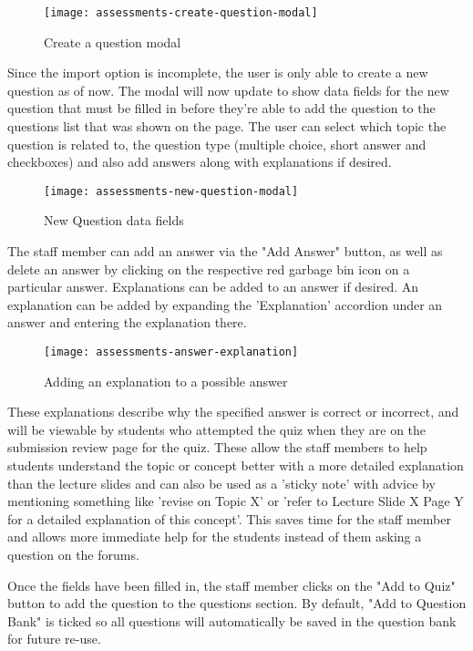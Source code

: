 \begin{figure}[!hbpt]
	\centering
	\texttt{[image: assessments-create-question-modal]}
	\caption{Create a question modal}
\end{figure}

Since the import option is incomplete, the user is only able to create a new question as of now. The modal will now update to show data fields for the new question that must be filled in before they're able to add the question to the questions list that was shown on the page. The user can select which topic the question is related to, the question type (multiple choice, short answer and checkboxes) and also add answers along with explanations if desired.

\begin{figure}[!hbpt]
	\centering
	\texttt{[image: assessments-new-question-modal]}
	\caption{New Question data fields}
\end{figure}

The staff member can add an answer via the "Add Answer" button, as well as delete an answer by clicking on the respective red garbage bin icon on a particular answer. Explanations can be added to an answer if desired. An explanation can be added by expanding the 'Explanation' accordion under an answer and entering the explanation there.

\begin{figure}[!hbpt]
	\centering
	\texttt{[image: assessments-answer-explanation]}
	\caption{Adding an explanation to a possible answer}
\end{figure}

These explanations describe why the specified answer is correct or incorrect, and will be viewable by students who attempted the quiz when they are on the submission review page for the quiz. These allow the staff members to help students understand the topic or concept better with a more detailed explanation than the lecture slides and can also be used as a 'sticky note' with advice by mentioning something like 'revise on Topic X' or 'refer to Lecture Slide X Page Y for a detailed explanation of this concept'. This saves time for the staff member and allows more immediate help for the students instead of them asking a question on the forums.

Once the fields have been filled in, the staff member clicks on the "Add to Quiz" button to add the question to the questions section. By default, "Add to Question Bank" is ticked so all questions will automatically be saved in the question bank for future re-use.

